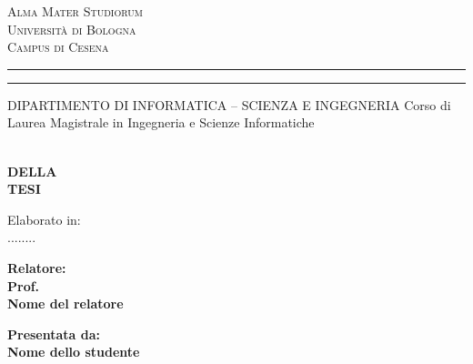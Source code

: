 \documentclass[12pt,a4paper,openright,twoside]{report}
\newcommand{\xstudent}{Nome dello studente}
\newcommand{\xsupervisor}{Nome del relatore}
\begin{document}


\oddsidemargin=25pt

\begin{titlepage}
\begin{center}
{{\Large{\textsc{Alma Mater Studiorum}}}\\
{\Large{\textsc{Universit\`a di Bologna}}} \\
{\textsc{Campus di Cesena}} \rule[0.1cm]{14cm}{0.1mm}
		\rule[0.5cm]{14cm}{0.6mm}
DIPARTIMENTO DI INFORMATICA – SCIENZA E INGEGNERIA
\color{red}Corso di Laurea Magistrale in Ingegneria e Scienze Informatiche }
\end{center}
\vspace{15mm}
\begin{center}
\\
\vspace{3mm}
{\LARGE{\bf DELLA}}\\
\vspace{3mm}
{\LARGE{\bf TESI}}\\
\end{center}
\vspace{15mm}
\begin{center}
 {\large{ Elaborato in:\\
\color{red}........\\}}
\end{center}
\vspace{20mm}
\par
\noindent
\begin{minipage}[t]{0.47\textwidth}
{\large{\bf Relatore:\\
\color{red}Prof.\\
\xsupervisor}}
\end{minipage}
\hfill
\begin{minipage}[t]{0.47\textwidth}\raggedleft
{\large{\bf Presentata da:\\
\color{red}\xstudent}}
\end{minipage}
\vspace{20mm}
\begin{center}
\end{center}
\end{titlepage}
\end{document}

